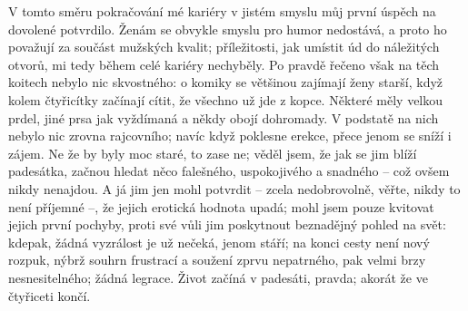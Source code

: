  V tomto směru pokračování mé kariéry v jistém smyslu můj první úspěch na dovolené potvrdilo. Ženám se obvykle smyslu pro humor nedostává, a proto ho považují za součást mužských kvalit; příležitosti, jak umístit úd do náležitých otvorů, mi tedy během celé kariéry nechyběly. Po pravdě řečeno však na těch koitech nebylo nic skvostného: o komiky se většinou zajímají ženy starší, když kolem čtyřicítky začínají cítit, že všechno už jde z kopce. Některé měly velkou prdel, jiné prsa jak vyždímaná a někdy obojí dohromady. V podstatě na nich nebylo nic zrovna rajcovního; navíc když poklesne erekce, přece jenom se sníží i zájem. Ne že by byly moc staré, to zase ne; věděl jsem, že jak se jim blíží padesátka, začnou hledat něco falešného, uspokojivého a snadného – což ovšem nikdy nenajdou. A já jim jen mohl potvrdit – zcela nedobrovolně, věřte, nikdy to není příjemné –, že jejich erotická hodnota upadá; mohl jsem pouze kvitovat jejich první pochyby, proti své vůli jim poskytnout beznadějný pohled na svět: kdepak, žádná vyzrálost je už nečeká, jenom stáří; na konci cesty není nový rozpuk, nýbrž souhrn frustrací a soužení zprvu nepatrného, pak velmi brzy nesnesitelného; žádná legrace. Život začíná v padesáti, pravda; akorát že ve čtyřiceti končí.

